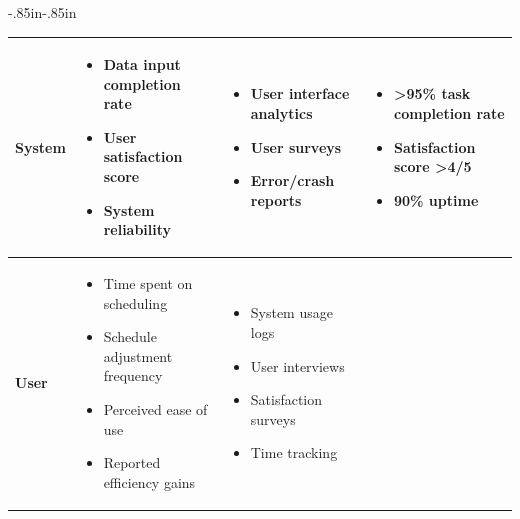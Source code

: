 \begin{table}[H]
\begin{adjustwidth}{-.85in}{-.85in}
\begin{tabularx}{1.3\textwidth}{|l|X|X|X|}
        \hline
        \textbf{System} &
        \begin{itemize}[nosep,leftmargin=*,topsep=2pt, partopsep=0pt, itemsep=1pt]
            \item Data input completion rate
            \item User satisfaction score
            \item System reliability
        \end{itemize} &
        \begin{itemize}[nosep,leftmargin=*,topsep=2pt, partopsep=0pt, itemsep=1pt]
            \item User interface analytics
            \item User surveys
            \item Error/crash reports
        \end{itemize} &
        \begin{itemize}[nosep,leftmargin=*,topsep=2pt, partopsep=0pt, itemsep=1pt]
            \item >95\% task completion rate
            \item Satisfaction score >4/5
            \item 90\% uptime
        \end{itemize} \\
        \hline
        \textbf{User} &
        \begin{itemize}[nosep,leftmargin=*,topsep=2pt, partopsep=0pt, itemsep=1pt]
            \item Time spent on scheduling
            \item Schedule adjustment frequency
            \item Perceived ease of use
            \item Reported efficiency gains
        \end{itemize} &
        \begin{itemize}[nosep,leftmargin=*,topsep=2pt, partopsep=0pt, itemsep=1pt]
            \item System usage logs
            \item User interviews
            \item Satisfaction surveys
            \item Time tracking
        \end{itemize} &

\end{tabularx}
\end{adjustwidth}
\end{table}
